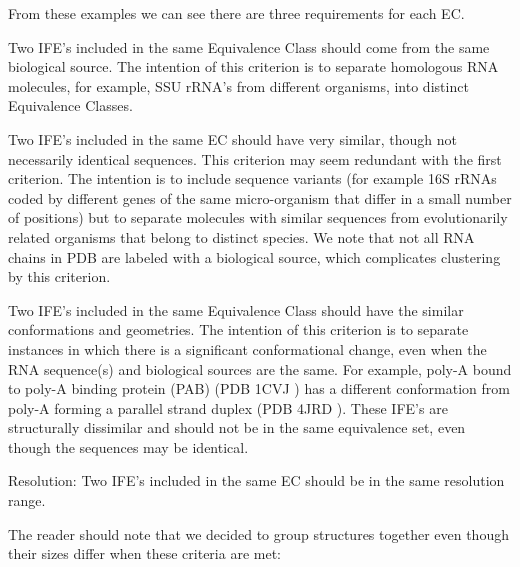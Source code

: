 From these examples we can see there are three requirements for each EC.
\begin{description}
  \item[Biological Source] Two IFE's included in the same Equivalence Class
    should come from the same biological source. The intention of this criterion
    is to separate homologous RNA molecules, for example, SSU rRNA's from
    different organisms, into distinct Equivalence Classes.

  \item[Sequence Similarity] Two IFE's included in the same EC should have very
    similar, though not necessarily identical sequences. This criterion may seem
    redundant with the first criterion. The intention is to include sequence
    variants (for example 16S rRNAs coded by different genes of the same
    micro-organism that differ in a small number of positions) but to separate
    molecules with similar sequences from evolutionarily related organisms that
    belong to distinct species. We note that not all RNA chains in PDB are
    labeled with a biological source, which complicates clustering by this
    criterion.

  \item[Geometric Similarity] Two IFE's included in the same Equivalence Class
    should have the similar conformations and geometries. The intention of this
    criterion is to separate instances in which there is a significant
    conformational change, even when the RNA sequence(s) and biological sources
    are the same. For example, poly-A bound to poly-A binding protein (PAB) (PDB
    1CVJ \cite{Deo1999}) has a different conformation from poly-A forming a
    parallel strand duplex (PDB 4JRD \cite{Safaee2013}). These IFE's are
    structurally dissimilar and should not be in the same equivalence set, even
    though the sequences may be identical.

  \item Resolution: Two IFE's included in the same EC should be in the same
    resolution range.
\end{description}

The reader should note that we decided to group structures together even though
their sizes differ when these criteria are met:

